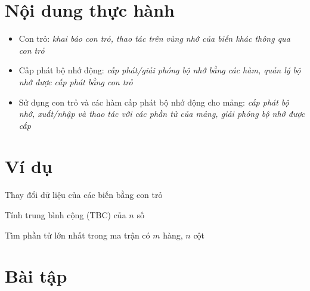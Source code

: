 
\section*{Nội dung thực hành}
\begin{itemize}
	\item Con trỏ: \textit{khai báo con trỏ, thao tác trên vùng nhớ của biến khác thông qua con trỏ}
	\item Cấp phát bộ nhớ động: \textit{cấp phát/giải phóng bộ nhớ bằng các hàm, quản lý bộ nhớ được cấp phát bằng con trỏ}
	\item Sử dụng con trỏ và các hàm cấp phát bộ nhớ động cho mảng: \textit{cấp phát bộ nhớ, xuất/nhập và thao tác với các phần tử của mảng, giải phóng bộ nhớ được cấp}
\end{itemize}


\section*{Ví dụ}
\begin{enumerate}
	
	\item Thay đổi dữ liệu của các biến bằng con trỏ
	
	
	\begin{minipage}[t]{0.42\textwidth}
		\item Tính trung bình cộng (TBC) của $n$ số
		
	\end{minipage}\qquad
	\begin{minipage}[t]{0.53\textwidth}
		\item Tìm phần tử lớn nhất trong ma trận có $m$ hàng, $n$ cột
		
	\end{minipage}
	
\end{enumerate}

\pagebreak
\section*{Bài tập}


